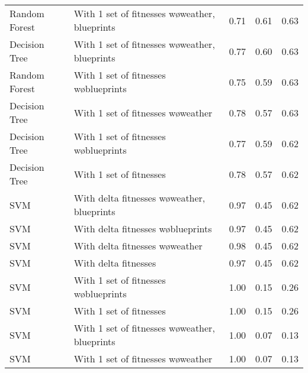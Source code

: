 \begin{tabular}{llrrr}
 Random Forest & With 1 set of fitnesses w\o weather, blueprints &       0.71 &    0.61 & 0.63 \\
 Decision Tree & With 1 set of fitnesses w\o weather, blueprints &       0.77 &    0.60 & 0.63 \\
 Random Forest &          With 1 set of fitnesses w\o blueprints &       0.75 &    0.59 & 0.63 \\
 Decision Tree &             With 1 set of fitnesses w\o weather &       0.78 &    0.57 & 0.63 \\
 Decision Tree &          With 1 set of fitnesses w\o blueprints &       0.77 &    0.59 & 0.62 \\
 Decision Tree &                         With 1 set of fitnesses &       0.78 &    0.57 & 0.62 \\
           SVM &    With delta fitnesses w\o weather, blueprints &       0.97 &    0.45 & 0.62 \\
           SVM &             With delta fitnesses w\o blueprints &       0.97 &    0.45 & 0.62 \\
           SVM &                With delta fitnesses w\o weather &       0.98 &    0.45 & 0.62 \\
           SVM &                            With delta fitnesses &       0.97 &    0.45 & 0.62 \\
           SVM &          With 1 set of fitnesses w\o blueprints &       1.00 &    0.15 & 0.26 \\
           SVM &                         With 1 set of fitnesses &       1.00 &    0.15 & 0.26 \\
           SVM & With 1 set of fitnesses w\o weather, blueprints &       1.00 &    0.07 & 0.13 \\
           SVM &             With 1 set of fitnesses w\o weather &       1.00 &    0.07 & 0.13 \\
\bottomrule
\end{tabular}
